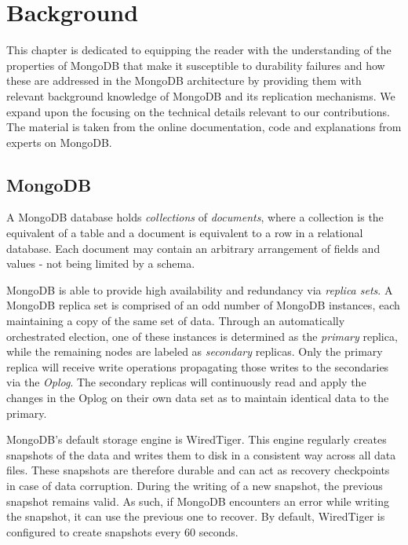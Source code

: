 \chapter{Background} \label{chap:background}

This chapter is dedicated to equipping the reader with the understanding of the properties of MongoDB that make it susceptible to durability failures and how these are addressed in the MongoDB architecture by providing them with relevant background knowledge of MongoDB and its replication mechanisms. We expand upon the  focusing on the technical details relevant to our contributions. The material is taken from the online documentation, code and explanations from experts on MongoDB.

\section{MongoDB}
\label{sec:mongodb}
A MongoDB database holds \textit{collections} of \textit{documents}, where a collection is the equivalent of a table and a document is equivalent to a row in a relational database. Each document may contain an arbitrary arrangement of fields and values - not being limited by a schema.

MongoDB is able to provide high availability and redundancy via \textit{replica sets}. A MongoDB replica set is comprised of an odd number of MongoDB instances, each maintaining a copy of the same set of data. Through an automatically orchestrated election, one of these instances is determined as the \textit{primary} replica, while the remaining nodes are labeled as \textit{secondary} replicas. Only the primary replica will receive write operations propagating those writes to the secondaries via the \textit{Oplog}. The secondary replicas will continuously read and apply the changes in the Oplog on their own data set as to maintain identical data to the primary.

MongoDB's default storage engine is WiredTiger. This engine regularly creates snapshots of the data and writes them to disk in a consistent way across all data files. These snapshots are therefore durable and can act as recovery checkpoints in case of data corruption. During the writing of a new snapshot, the previous snapshot remains valid. As such, if MongoDB encounters an error while writing the snapshot, it can use the previous one to recover. By default, WiredTiger is configured to create snapshots every 60 seconds.

